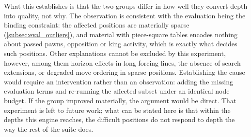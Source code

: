 What this establishes is that the two groups differ in how well they convert
depth into quality, not why. The observation is consistent with the evaluation
being the binding constraint: the affected positions are materially sparse
(\cref{subsec:eval_outliers}), and material with piece-square tables encodes
nothing about passed pawns, opposition or king activity, which is exactly what
decides such positions. Other explanations cannot be excluded by this experiment,
however, among them horizon effects in long forcing lines, the absence of search
extensions, or degraded move ordering in sparse positions. Establishing the cause
would require an intervention rather than an observation: adding the missing
evaluation terms and re-running the affected subset under an identical node
budget. If the group improved materially, the argument would be direct. That
experiment is left to future work; what can be stated here is that within the
depths this engine reaches, the difficult positions do not respond to depth the
way the rest of the suite does.
